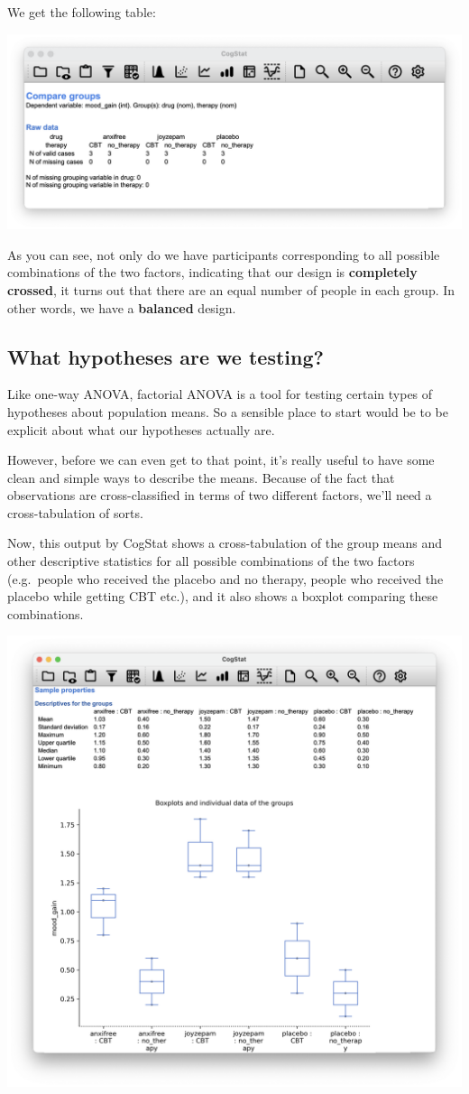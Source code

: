 \documentclass[
]{book}
\theoremstyle{definition}
\theoremstyle{definition}
\theoremstyle{definition}
\theoremstyle{definition}
\theoremstyle{remark}
\begin{document}
We get the following table:

\begin{center}\includegraphics[width=0.66\linewidth]{resources/image/cogstatanova2clinload} \end{center}

As you can see, not only do we have participants corresponding to all possible combinations of the two factors, indicating that our design is \textbf{completely crossed}, it turns out that there are an equal number of people in each group. In other words, we have a \textbf{balanced} design.

\hypertarget{factanovahyp}{%
\subsection{What hypotheses are we testing?}\label{factanovahyp}}

Like one-way ANOVA, factorial ANOVA is a tool for testing certain types of hypotheses about population means. So a sensible place to start would be to be explicit about what our hypotheses actually are.

However, before we can even get to that point, it's really useful to have some clean and simple ways to describe the means. Because of the fact that observations are cross-classified in terms of two different factors, we'll need a cross-tabulation of sorts.

Now, this output by CogStat shows a cross-tabulation of the group means and other descriptive statistics for all possible combinations of the two factors (e.g.~people who received the placebo and no therapy, people who received the placebo while getting CBT etc.), and it also shows a boxplot comparing these combinations.

\begin{center}\includegraphics[width=0.66\linewidth]{resources/image/cogstatanova2boxplotclinical} \end{center}
\end{document}

